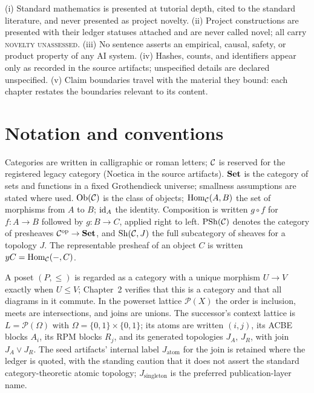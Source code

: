\begin{ruleenv}\label{ch01:rule:claims}
(i) Standard mathematics is presented at tutorial depth, cited to the
standard literature, and never presented as project novelty. (ii) Project
constructions are presented with their ledger statuses attached and are
never called novel; all carry \textsc{novelty unassessed}. (iii) No
sentence asserts an empirical, causal, safety, or product property of any
AI system. (iv) Hashes, counts, and identifiers appear only as recorded in
the source artifacts; unspecified details are declared unspecified. (v)
Claim boundaries travel with the material they bound: each chapter restates
the boundaries relevant to its content.
\end{ruleenv}

\section{Notation and conventions}\label{ch01:sec:notation}

\begin{notation}\label{ch01:not:general}
Categories are written in calligraphic or roman letters; $\mathcal{C}$ is reserved
for the registered legacy category ($\mathrm{Noetica}$ in the source
artifacts). $\mathbf{Set}$ is the category of sets and functions in a fixed
Grothendieck universe; smallness assumptions are stated where used.
$\mathrm{Ob}(\mathcal{C})$ is the class of objects; $\mathrm{Hom}_{\mathcal{C}}(A,B)$ the set of morphisms
from $A$ to $B$; $\mathrm{id}_A$ the identity. Composition is written
$g \circ f$ for $f : A \to B$ followed by $g : B \to C$, applied right to
left. $\mathrm{PSh}(\mathcal{C})$ denotes the category of presheaves
$\mathcal{C}^{\mathrm{op}} \to \mathbf{Set}$, and $\mathrm{Sh}(\mathcal{C}, J)$ the full subcategory of
sheaves for a topology $J$. The representable presheaf of an object $C$ is
written $yC = \mathrm{Hom}_{\mathcal{C}}(-, C)$.
\end{notation}

\begin{notation}\label{ch01:not:posets}
A poset $(P, \le)$ is regarded as a category with a unique morphism
$U \to V$ exactly when $U \le V$; Chapter~2 verifies that this is a
category and that all diagrams in it commute. In the powerset lattice
$\mathcal{P}(X)$ the order is inclusion, meets are intersections, and joins
are unions. The successor's context lattice is
$L = \mathcal{P}(\Omega)$ with $\Omega = \{0,1\} \times \{0,1\}$; its
atoms are written $(i,j)$, its ACBE blocks $A_i$, its RPM blocks $R_j$,
and its generated topologies $J_A$, $J_R$, with join
$J_A \vee J_R$. The seed artifacts' internal label $J_{\mathrm{atom}}$ for
the join is retained where the ledger is quoted, with the standing caution
that it does not assert the standard category-theoretic atomic topology;
$J_{\mathrm{singleton}}$ is the preferred publication-layer name.
\end{notation}

